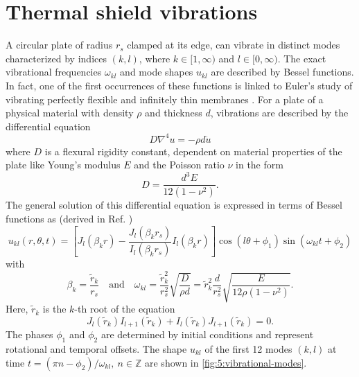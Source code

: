 \newpage
\section{Thermal shield vibrations}\label{sec:5:thermal-vibrations}

A circular plate of radius $r_s$ clamped at its edge, can vibrate in distinct modes characterized by indices $(k,l)$, where $k \in [1,\infty)$ and $l \in [0, \infty)$.
The exact vibrational frequencies $\omega_{kl}$ and mode shapes $u_{kl}$ are described by Bessel functions.
In fact, one of the first occurrences of these functions is linked to Euler's study of vibrating perfectly flexible and infinitely thin membranes \cite{Dutka_1995}.
For a plate of a physical material with density $\rho$ and thickness $d$, vibrations are described by the differential equation \cite[p. 490]{Rao_2019}
\begin{equation}
  D \nabla^4 u = -\rho d \ddot{u}
\end{equation} 
where $D$ is a flexural rigidity constant, dependent on material properties of the plate like Young's modulus $E$ and the Poisson ratio $\nu$ in the form
\begin{equation}
  D = \frac{d^3 E}{12(1-\nu^2)} .
\end{equation}
The general solution of this differential equation is expressed in terms of Bessel functions as (derived in Ref. \cite[p. 490-495]{Rao_2019}) 
\begin{equation}
  u_{kl}(r, \theta, t) = \left[J_l(\beta_k r) - \frac{J_l(\beta_k r_s)}{I_l(\beta_k r_s)}I_l(\beta_k r)\right]\cos(l\theta+\phi_1)\sin(\omega_{kl}t+\phi_2)
\end{equation}
with
\begin{equation} \label{eq:5:vibration-frequency}
  \beta_k = \frac{\tilde{r}_k}{r_s} \quad \text{and} \quad \omega_{kl} = \frac{\tilde{r}_k^2}{r_s^2}\sqrt{\frac{D}{\rho d}} = \tilde{r}_k^2\frac{d}{r_s^2}\sqrt{\frac{E}{12\rho(1-\nu^2)}} .
\end{equation}
Here, $\tilde{r}_k$ is the $k$-th root of the equation
\begin{equation}\label{eq:5:bessel-zeros}
  J_l(\tilde{r}_k)I_{l+1}(\tilde{r}_k)+I_l(\tilde{r}_k)J_{l+1}(\tilde{r}_k) = 0 .
\end{equation}
The phases $\phi_1$ and $\phi_2$ 
are determined by initial conditions and represent rotational and temporal offsets.
The shape $u_{kl}$ of the first 12 modes $(k,l)$ at time $t=(\pi n - \phi_2) / \omega_{kl},\ n\in\mathbb{Z}$ are shown in \cref{fig:5:vibrational-modes}.
